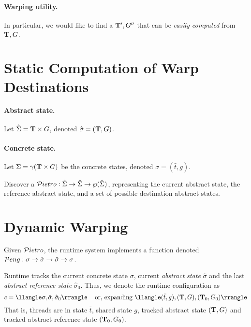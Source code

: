 \paragraph{Warping utility.}
In particular, we would like to find a $\mathbf{T}',G''$ that can be 
\emph{easily computed} from $\mathbf{T},G$.



\section{Static Computation of Warp Destinations}

\paragraph{Abstract state.}
Let $\hat{\Sigma} = \mathbf{T} \times G$, denoted $\hat{\sigma} = (\mathbf{T},G)$.

\newcommand\ts{\bar{t}}

\paragraph{Concrete state.}
Let $\Sigma = \gamma(\mathbf{T} \times G)$ be the concrete states, denoted $\sigma = (\ts,g)$.

\newcommand\Pietrot{{\cal P}ietro}

Discover a $\Pietrot : \hat{\Sigma} \rightarrow \hat{\Sigma}
\rightarrow \wp({\hat{\Sigma}})$, representing the current abstract
state, the reference abstract state, and a set of possible destination
abstract states.



\section{Dynamic Warping}

\newcommand\Pengt{{\cal P}eng}
Given $\Pietrot$, the runtime system implements a function
denoted $\Pengt : \sigma \rightarrow \hat{\sigma} \rightarrow \hat{\sigma} \rightarrow \sigma$. 


Runtime tracks the current concrete state $\sigma$,
current \emph{abstract state} $\hat{\sigma}$ and the last
\emph{abstract reference state} $\hat{\sigma}_0$. Thus, we denote the runtime
configuration as
$$
    c =  \llangle \sigma,\hat{\sigma},\hat{\sigma}_0 \rrangle 
\;\;\;\text{ or, expanding }
    \llangle (\ts,g),(\Ts,G),(\Ts_0,G_0) \rrangle 
$$
That is, threads are in state $\ts$, shared state $g$, tracked abstract state
$(\mathbf{T},G)$ and tracked abstract reference state $(\mathbf{T}_0,G_0)$.

